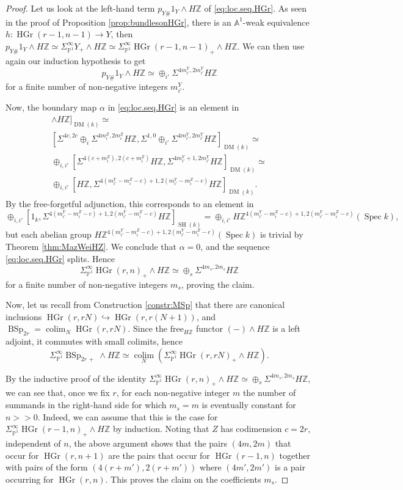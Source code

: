 \documentclass[10pt]{amsart}
\theoremstyle{definition}
\theoremstyle{plain}
\numberwithin{equation}{section}
\newcommand{\0}{\emptyset}
\newcommand{\A}{{\mathbb A}}
\renewcommand{\P}{{\mathbb P}}
\newcommand{\Z}{{\mathbb Z}}
\newcommand{\BSp}{{\operatorname{BSp}}}
\newcommand{\HGr}{{\operatorname{HGr}}}
\newcommand{\Spec}{{\operatorname{Spec}}}
\newcommand{\SH}{{\operatorname{SH}}}
\newcommand{\DM}{{\operatorname{DM}}}
\newcommand{\colim}{{\operatorname*{colim}}}
\begin{document}
\begin{proof}
    Let us look at the left-hand term $p_{Y\#}1_Y \wedge H\Z$ of \eqref{eq:loc.seq.HGr}. As seen in the proof of Proposition \ref{prop:bundlesonHGr}, there is an $\A^1$-weak equivalence $h:\HGr(r-1,n-1) \to Y$, then $p_{Y\#}1_Y \wedge H\Z \simeq \Sigma^\infty_{\P^1}Y_+\wedge H\Z \simeq \Sigma_{\P^1}^\infty \HGr(r-1,n-1)_+ \wedge H\Z$. We can then use again our induction hypothesis to get
    $$p_{Y\#}1_Y \wedge H\Z\simeq \oplus_{i'} \Sigma^{4m_{i'}^Y,2m_{i'}^Y}H\Z$$
    for a finite number of non-negative integers $m_{i'}^Y$.

    Now, the boundary map $\alpha$ in \eqref{eq:loc.seq.HGr} is an element in
    \begin{multline*}
         [p_\# i_*i^*1_X \wedge H\Z,j_!j^!1_X[1] \wedge H\Z]_{\DM(k)}\simeq \\
         [\Sigma^{4c,2c}\oplus_i \Sigma^{4m_i^Z,2m_i^Z}H\Z,\Sigma^{1,0}\oplus_{i'} \Sigma^{4m_{i'}^Y,2m_{i'}^Y}H\Z]_{\DM(k)} \simeq \\
         \oplus_{i,i'}[\Sigma^{4(c+m_i^Z),2(c+m_i^Z)}H\Z, \Sigma^{4m_{i'}^Y+1,2m_{i'}^Y}H\Z]_{\DM(k)} \simeq \\
         \oplus_{i,i'}[H\Z, \Sigma^{4(m_{i'}^Y-m_i^Z-c)+1,2(m_{i'}^Y-m_i^Z-c)}H\Z]_{\DM(k)}.
    \end{multline*}
    By the free-forgetful adjunction, this corresponds to an element in
    $$\oplus_{i,i'}[1_k, \Sigma^{4(m_{i'}^Y-m_i^Z-c)+1,2(m_{i'}^Y-m_i^Z-c)}H\Z]_{\SH(k)} = \oplus_{i,i'}H\Z^{4(m_{i'}^Y-m_i^Z-c)+1,2(m_{i'}^Y-m_i^Z-c)}(\Spec k),$$
    but each abelian group $H\Z^{4(m_{i'}^Y-m_i^Z-c)+1,2(m_{i'}^Y-m_i^Z-c)}(\Spec k)$ is trivial by Theorem \ref{thm:MazWeiHZ}. We conclude that $\alpha=0$, and the sequence \eqref{eq:loc.seq.HGr} splits. Hence 
    $$\Sigma^\infty_{\P^1}\HGr(r,n)_+ \wedge H\Z \simeq \oplus_s\Sigma^{4m_s,2m_s}H\Z$$
    for a finite number of non-negative integers $m_s$, proving the claim.

    Now, let us recall from Construction \ref{constr:MSp} that there are canonical inclusions $\HGr(r,rN) \hookrightarrow \HGr(r,r(N+1))$, and $\BSp_{2r}=\colim_N \HGr(r,rN)$. Since the $\text{free}_{H\Z}$ functor $(-)\wedge H\Z$ is a left adjoint, it commutes with small colimits, hence 
    \begin{equation}
    \label{eq:MotiveOfBsp}
        \Sigma_{\P^1}^\infty \BSp_{2r \, +}\wedge H\Z \simeq \colim_N(\Sigma_{\P^1}^\infty \HGr(r,rN)_+\wedge H\Z).
    \end{equation}

    By the inductive proof of the identity $\Sigma^\infty_{\P^1} \HGr(r,n)_+ \wedge H\Z \simeq \oplus_s \Sigma^{4m_s,2m_s}H\Z$, we can see that, once we fix $r$, for each non-negative integer $m$ the number of summands in the right-hand side for which $m_s=m$ is eventually constant for $n>>0$. Indeed, we can assume that this is the case for $\Sigma^\infty_{\P^1} \HGr(r-1,n)_+ \wedge H\Z$ by induction. Noting that $Z$ has codimension $c=2r$, independent of $n$, the above argument shows that the pairs $(4m,2m)$ that occur for $\HGr(r,n+1)$ are the pairs that occur for $\HGr(r-1,n)$ together with pairs of the form $(4(r+m'), 2(r+m'))$ where $(4m',2m')$ is a pair occurring for $\HGr(r,n)$. This proves the claim on the coefficients $m_s$.
    

\end{proof}
\end{document}
